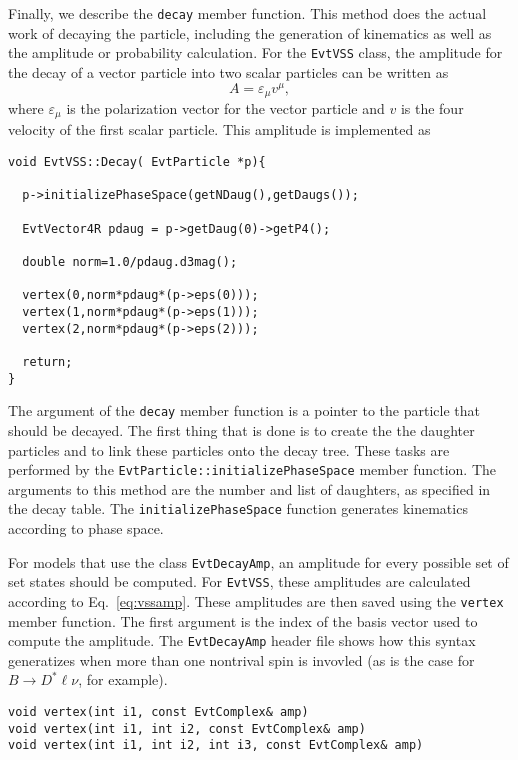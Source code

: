 Finally, we describe the {\tt decay} member function. This method
does the actual work of decaying the particle,
including the generation of kinematics as well as 
the amplitude or probability 
calculation.  For the {\tt EvtVSS} class, the amplitude for
the decay of a vector particle into two scalar particles
can be written as
\begin{equation}
A=\varepsilon_{\mu}v^{\mu},
\label{eq:vssamp}
\end{equation}
where $\varepsilon_{\mu}$ is the polarization vector for the 
vector particle and $v$ is the four velocity of the first
scalar particle.  This amplitude is implemented as

\begin{footnotesize}
\begin{verbatim}
void EvtVSS::Decay( EvtParticle *p){

  p->initializePhaseSpace(getNDaug(),getDaugs());

  EvtVector4R pdaug = p->getDaug(0)->getP4();
  
  double norm=1.0/pdaug.d3mag();

  vertex(0,norm*pdaug*(p->eps(0)));
  vertex(1,norm*pdaug*(p->eps(1)));
  vertex(2,norm*pdaug*(p->eps(2)));

  return;
}
\end{verbatim}
\end{footnotesize}

The argument of the {\tt decay}
member function is a pointer to the particle that should be
decayed. The first thing that is done is to create the
the daughter particles and to
link these particles onto the decay tree. 
These tasks are performed by the {\tt EvtParticle::initializePhaseSpace} 
member function.
The arguments to this method are the number and list of 
daughters, as specified in the decay table.
The {\tt initializePhaseSpace} function 
generates kinematics according to phase space.

For models that use the class {\tt EvtDecayAmp},
an amplitude for every possible set of set states
should be computed.  For {\tt EvtVSS}, these
amplitudes are calculated
according to Eq.~\ref{eq:vssamp}. These amplitudes are
then saved using the {\tt vertex} member
function.  The first argument is the index of the 
basis vector used to compute the amplitude.
The {\tt EvtDecayAmp} header file shows how this syntax
generatizes when more than one nontrival spin is invovled
(as is the case for $B \rightarrow D^* \ell \nu$, for example).
\begin{footnotesize}
\begin{verbatim}
void vertex(int i1, const EvtComplex& amp)
void vertex(int i1, int i2, const EvtComplex& amp)
void vertex(int i1, int i2, int i3, const EvtComplex& amp)
\end{verbatim}
\end{footnotesize}

